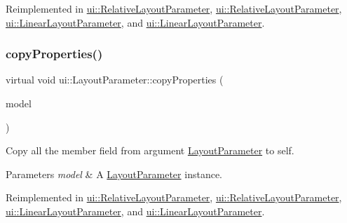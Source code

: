 Reimplemented in \hyperlink{classui_1_1RelativeLayoutParameter_a370cb1f399839e47fcc471d8dfc7fffc}{ui\+::\+Relative\+Layout\+Parameter}, \hyperlink{classui_1_1RelativeLayoutParameter_a901aed8a9c121ff7c62a488facc7edfd}{ui\+::\+Relative\+Layout\+Parameter}, \hyperlink{classui_1_1LinearLayoutParameter_aadf884af74f03c8e31bd832082dfff6f}{ui\+::\+Linear\+Layout\+Parameter}, and \hyperlink{classui_1_1LinearLayoutParameter_a8d9e9d1475927a7dcfda3cfe0581f164}{ui\+::\+Linear\+Layout\+Parameter}.

\mbox{\label{classui_1_1LayoutParameter_a59b36d5608cf7353dd5916ea331745a2}} 
\subsubsection{\texorpdfstring{copy\+Properties()}{copyProperties()}\hspace{0.1cm}{\footnotesize\ttfamily [2/2]}}
{\footnotesize\ttfamily virtual void ui\+::\+Layout\+Parameter\+::copy\+Properties (\begin{DoxyParamCaption}\item[{\hyperlink{classui_1_1LayoutParameter}{Layout\+Parameter} $\ast$}]{model }\end{DoxyParamCaption})\hspace{0.3cm}{\ttfamily [virtual]}}

Copy all the member field from argument \hyperlink{classui_1_1LayoutParameter}{Layout\+Parameter} to self. 
\begin{DoxyParams}{Parameters}
{\em model} & A \hyperlink{classui_1_1LayoutParameter}{Layout\+Parameter} instance. \\
\hline
\end{DoxyParams}


Reimplemented in \hyperlink{classui_1_1RelativeLayoutParameter_a370cb1f399839e47fcc471d8dfc7fffc}{ui\+::\+Relative\+Layout\+Parameter}, \hyperlink{classui_1_1RelativeLayoutParameter_a901aed8a9c121ff7c62a488facc7edfd}{ui\+::\+Relative\+Layout\+Parameter}, \hyperlink{classui_1_1LinearLayoutParameter_aadf884af74f03c8e31bd832082dfff6f}{ui\+::\+Linear\+Layout\+Parameter}, and \hyperlink{classui_1_1LinearLayoutParameter_a8d9e9d1475927a7dcfda3cfe0581f164}{ui\+::\+Linear\+Layout\+Parameter}.

\mbox{\label{classui_1_1LayoutParameter_a2de6ed250036c47f60a16c17d3ba8de1}} 
